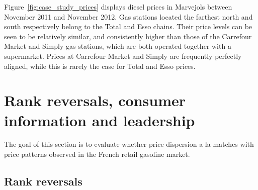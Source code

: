 \documentclass[english]{article}
\begin{document}
Figure~\ref{fig:case_study_prices} displays diesel prices in Marvejols between November 2011 and November 2012. Gas stations located the farthest north and south respectively belong to the Total and Esso chains. Their price levels can be seen to be relatively similar, and consistently higher than those of the Carrefour Market and Simply gas stations, which are both operated together with a supermarket. Prices at Carrefour Market and Simply are frequently perfectly aligned, while this is rarely the case for Total and Esso prices.

\section{Rank reversals, consumer information and leadership}

The goal of this section is to evaluate whether price dispersion a la \cite{VAR80} matches with price patterns observed in the French retail gasoline market.

\subsection{Rank reversals}
\end{document}
